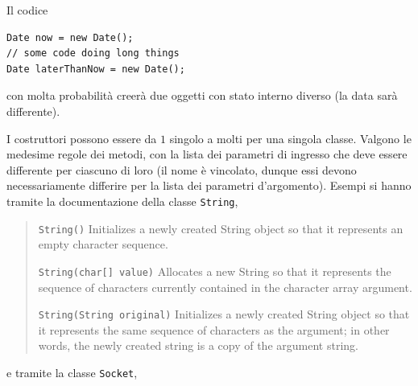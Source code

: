 \documentclass[\fontsizeclass,twocolumn]{\classname}
\theoremstyle{definition}
\theoremstyle{definition}
\begin{document}
Il codice

\begin{lstlisting}
Date now = new Date();
// some code doing long things
Date laterThanNow = new Date();
\end{lstlisting}

con molta probabilità creerà due oggetti con stato interno diverso (la data
sarà differente).

I costruttori possono essere da $1$ singolo a molti per una singola classe.
Valgono le medesime regole dei metodi, con la lista dei parametri di ingresso
che deve essere differente per ciascuno di loro (il nome è vincolato, dunque
essi devono necessariamente differire per la lista dei parametri d'argomento).
Esempi si hanno tramite la documentazione della classe \texttt{String},


\begin{quote}
    \footnotesize{
    \texttt{String()}       Initializes a newly created String object so that it represents
an empty character sequence.

\texttt{String(char[] value)}       Allocates a new String so that it represents the
sequence of characters currently contained in the character array argument.

\texttt{String(String original)}       Initializes a newly created String object so that
it represents the same sequence of characters as the argument; in other words,
the newly created string is a copy of the argument string.}
\end{quote}


e tramite la classe \texttt{Socket},
\end{document}
